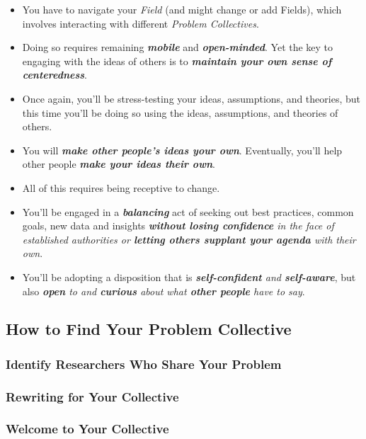 \documentclass[11pt]{article}
\begin{document}
\begin{itemize}
\item You have to navigate your \emph{Field} (and might change or add Fields), which involves interacting with different \emph{Problem Collectives}.

\item Doing so requires remaining \emph{\textbf{mobile}} and \emph{\textbf{open-minded}}. Yet the key to engaging with the ideas of others is to \emph{\textbf{maintain your own sense of centeredness}}.

\item Once again, you’ll be stress-testing your ideas, assumptions, and theories, but this time you’ll be doing so using the ideas, assumptions, and theories of others.

\item You will \emph{\textbf{make other people’s ideas your own}}. Eventually, you’ll help other people \emph{\textbf{make your ideas their own}}.

\item All of this requires being receptive to change. 

\item You’ll be engaged in a \emph{\textbf{balancing}} act of  seeking out best practices, common goals, new data and insights \emph{\textbf{without losing confidence} in the face of established authorities or \textbf{letting others supplant your agenda} with their own}. 

\item You’ll be adopting a disposition that is \emph{\textbf{self-confident} and \textbf{self-aware}}, but also \emph{\textbf{open} to and \textbf{curious} about what \textbf{other people} have to say}. 
\end{itemize}
   
\subsection{How to Find Your Problem Collective}
\subsubsection{Identify Researchers Who Share Your Problem}
\subsubsection{Rewriting for Your Collective}
\subsubsection{Welcome to Your Collective}
\end{document}
